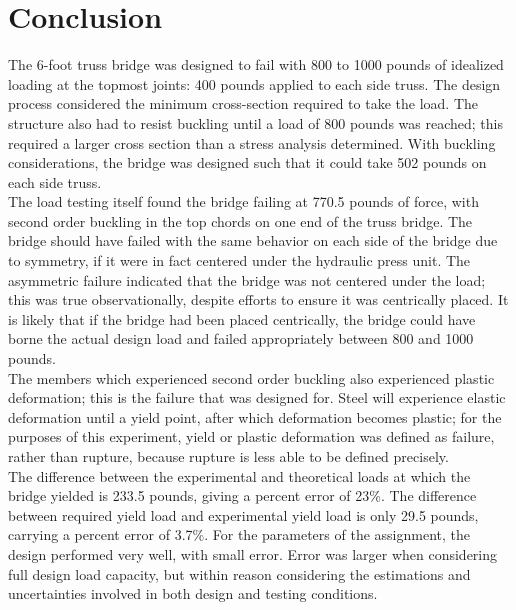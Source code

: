 \documentclass{article}
\begin{document}
    \newpage
    \section{Conclusion}
    \indent The 6-foot truss bridge was designed to fail with 800 to 1000 pounds of idealized loading at the topmost joints: 400 pounds applied to each side truss. The design process considered the minimum cross-section required to take the load. The structure also had to resist buckling until a load of 800 pounds was reached; this required a larger cross section than a stress analysis determined. With buckling considerations, the bridge was designed such that it could take 502 pounds on each side truss. \\
    \indent The load testing itself found the bridge failing at 770.5 pounds of force, with second order buckling in the top chords on one end of the truss bridge. The bridge should have failed with the same behavior on each side of the bridge due to symmetry, if it were in fact centered under the hydraulic press unit. The asymmetric failure indicated that the bridge was not centered under the load; this was true observationally, despite efforts to ensure it was centrically placed. It is likely that if the bridge had been placed centrically, the bridge could have borne the actual design load and failed appropriately between 800 and 1000 pounds. \\
    \indent The members which experienced second order buckling also experienced plastic deformation; this is the failure that was designed for. Steel will experience elastic deformation until a yield point, after which deformation becomes plastic; for the purposes of this experiment, yield or plastic deformation was defined as failure, rather than rupture, because rupture is less able to be defined precisely. \\
    \indent The difference between the experimental and theoretical loads at which the bridge yielded is 233.5 pounds, giving a percent error of 23\%. The difference between required yield load and experimental yield load is only 29.5 pounds, carrying a percent error of 3.7\%. For the parameters of the assignment, the design performed very well, with small error. Error was larger when considering full design load capacity, but within reason considering the estimations and uncertainties involved in both design and testing conditions. \\
\end{document}
